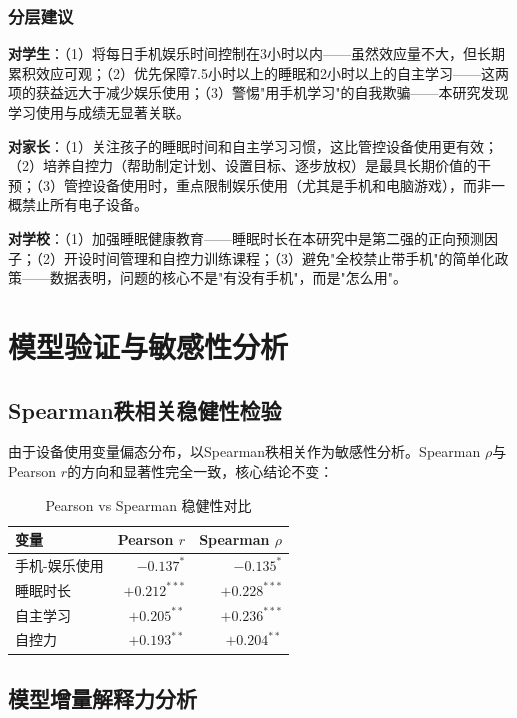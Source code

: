 \documentclass[11pt]{ctexart}
\begin{document}
\subsubsection{分层建议}

\textbf{对学生}：（1）将每日手机娱乐时间控制在3小时以内——虽然效应量不大，但长期累积效应可观；（2）优先保障7.5小时以上的睡眠和2小时以上的自主学习——这两项的获益远大于减少娱乐使用；（3）警惕"用手机学习"的自我欺骗——本研究发现学习使用与成绩无显著关联。

\textbf{对家长}：（1）关注孩子的睡眠时间和自主学习习惯，这比管控设备使用更有效；（2）培养自控力（帮助制定计划、设置目标、逐步放权）是最具长期价值的干预；（3）管控设备使用时，重点限制娱乐使用（尤其是手机和电脑游戏），而非一概禁止所有电子设备。

\textbf{对学校}：（1）加强睡眠健康教育——睡眠时长在本研究中是第二强的正向预测因子；（2）开设时间管理和自控力训练课程；（3）避免"全校禁止带手机"的简单化政策——数据表明，问题的核心不是"有没有手机"，而是"怎么用"。

\section{模型验证与敏感性分析}

\subsection{Spearman秩相关稳健性检验}

由于设备使用变量偏态分布，以Spearman秩相关作为敏感性分析。Spearman $\rho$与Pearson $r$的方向和显著性完全一致，核心结论不变：

\begin{table}[H]
\centering
\caption{Pearson vs Spearman 稳健性对比}
\begin{tabular}{lrr}
\toprule
变量 & Pearson $r$ & Spearman $\rho$ \\
\midrule
手机-娱乐使用 & $-0.137^{*}$ & $-0.135^{*}$ \\
睡眠时长 & $+0.212^{***}$ & $+0.228^{***}$ \\
自主学习 & $+0.205^{**}$ & $+0.236^{***}$ \\
自控力 & $+0.193^{**}$ & $+0.204^{**}$ \\
\bottomrule
\end{tabular}
\end{table}

\subsection{模型增量解释力分析}
\end{document}
